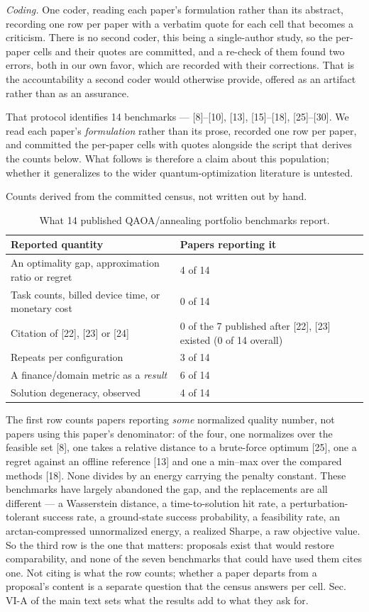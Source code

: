 \documentclass[journal]{IEEEtran}
\begin{document}
\textit{Coding.} One coder, reading each paper's formulation rather than its abstract, recording one row per paper with a verbatim quote for each cell that becomes a criticism. There is no second coder, this being a single-author study, so the per-paper cells and their quotes are committed, and a re-check of them found two errors, both in our own favor, which are recorded with their corrections. That is the accountability a second coder would otherwise provide, offered as an artifact rather than as an assurance.


That protocol identifies 14 benchmarks --- [8]--[10], [13], [15]--[18], [25]--[30]. We read each paper's \textit{formulation} rather than its prose, recorded one row per paper, and committed the per-paper cells with quotes alongside the script that derives the counts below. What follows is therefore a claim about this population; whether it generalizes to the wider quantum-optimization literature is untested.


Counts derived from the committed census, not written out by hand.


\begin{table}[!t]
\centering
\scriptsize
\caption{What 14 published QAOA/annealing portfolio benchmarks report.}
\label{tab:S1}
\begin{tabular}{p{}p{}}
\toprule
Reported quantity & Papers reporting it \\
\midrule
An optimality gap, approximation ratio or regret & 4 of 14 \\
Task counts, billed device time, or monetary cost & 0 of 14 \\
Citation of [22], [23] or [24] & 0 of the 7 published after [22], [23] existed (0 of 14 overall) \\
Repeats per configuration & 3 of 14 \\
A finance/domain metric as a \textit{result} & 6 of 14 \\
Solution degeneracy, observed & 4 of 14 \\
\bottomrule
\end{tabular}
\end{table}


The first row counts papers reporting \textit{some} normalized quality number, not papers using this paper's denominator: of the four, one normalizes over the feasible set [8], one takes a relative distance to a brute-force optimum [25], one a regret against an offline reference [13] and one a min--max over the compared methods [18]. None divides by an energy carrying the penalty constant. These benchmarks have largely abandoned the gap, and the replacements are all different --- a Wasserstein distance, a time-to-solution hit rate, a perturbation-tolerant success rate, a ground-state success probability, a feasibility rate, an arctan-compressed unnormalized energy, a realized Sharpe, a raw objective value. So the third row is the one that matters: proposals exist that would restore comparability, and none of the seven benchmarks that could have used them cites one. Not citing is what the row counts; whether a paper departs from a proposal's content is a separate question that the census answers per cell. Sec. VI-A of the main text sets what the results add to what they ask for.
\end{document}
